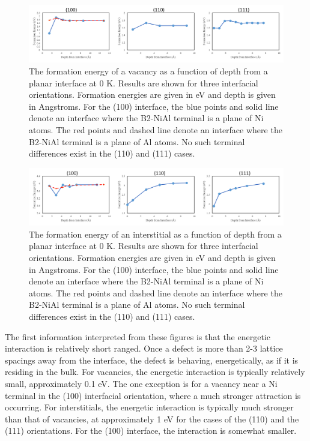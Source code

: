 \documentclass[review]{elsarticle}
\begin{document}
\begin{figure}[htp]
   \centering
   \includegraphics[width=\textwidth]{vac_nf.png} 
   \caption{The formation energy of a vacancy as a function of depth from a planar interface at 0 K.  Results are shown for three interfacial orientations.  Formation energies are given in eV and depth is given in Angstroms.  For the (100) interface, the blue points and solid line denote an interface where the B2-NiAl terminal is a plane of Ni atoms.  The red points and dashed line denote an interface where the B2-NiAl terminal is a plane of Al atoms.  No such terminal differences exist in the (110) and (111) cases.}
   \label{fig:example}
\end{figure}

\begin{figure}[htp]
   \centering
   \includegraphics[width=\textwidth]{int_nf.png} 
   \caption{The formation energy of an interstitial as a function of depth from a planar interface at 0 K.  Results are shown for three interfacial orientations.  Formation energies are given in eV and depth is given in Angstroms.  For the (100) interface, the blue points and solid line denote an interface where the B2-NiAl terminal is a plane of Ni atoms.  The red points and dashed line denote an interface where the B2-NiAl terminal is a plane of Al atoms.  No such terminal differences exist in the (110) and (111) cases.}
   \label{fig:example}
\end{figure}

The first information interpreted from these figures is that the energetic interaction is relatively short ranged.  Once a defect is more than 2-3 lattice spacings away from the interface, the defect is behaving, energetically, as if it is residing in the bulk.  For vacancies, the energetic interaction is typically relatively small, approximately 0.1 eV.  The one exception is for a vacancy near a Ni terminal in the (100) interfacial orientation, where a much stronger attraction is occurring.  For interstitials, the energetic interaction is typically much stronger than that of vacancies, at approximately 1 eV for the cases of the (110) and the (111) orientations.  For the (100) interface, the interaction is somewhat smaller.  
\FloatBarrier
\end{document}

